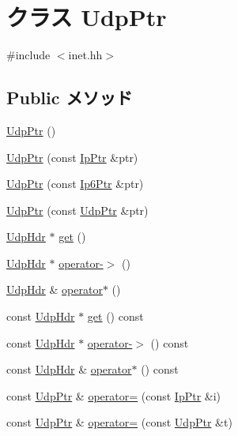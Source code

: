\hypertarget{classNet_1_1UdpPtr}{
\section{クラス UdpPtr}
\label{classNet_1_1UdpPtr}
}


{\ttfamily \#include $<$inet.hh$>$}\subsection*{Public メソッド}
\begin{DoxyCompactItemize}
\item 
\hyperlink{classNet_1_1UdpPtr_abcd425aa7abed2d3c310a9a911ee3dd8}{UdpPtr} ()
\item 
\hyperlink{classNet_1_1UdpPtr_a37b049e8b05df97038b6520b650880f8}{UdpPtr} (const \hyperlink{classNet_1_1IpPtr}{IpPtr} \&ptr)
\item 
\hyperlink{classNet_1_1UdpPtr_afbb62bb41d751a157c1969b023b3ac2c}{UdpPtr} (const \hyperlink{classNet_1_1Ip6Ptr}{Ip6Ptr} \&ptr)
\item 
\hyperlink{classNet_1_1UdpPtr_a3fb1538c6e5e4348f6dfdb963fc4b724}{UdpPtr} (const \hyperlink{classNet_1_1UdpPtr}{UdpPtr} \&ptr)
\item 
\hyperlink{structNet_1_1UdpHdr}{UdpHdr} $\ast$ \hyperlink{classNet_1_1UdpPtr_a894be408d8fb0e2b4224991c64ed69e0}{get} ()
\item 
\hyperlink{structNet_1_1UdpHdr}{UdpHdr} $\ast$ \hyperlink{classNet_1_1UdpPtr_a04f04b83c0b726766c5767db893bf65e}{operator-\/$>$} ()
\item 
\hyperlink{structNet_1_1UdpHdr}{UdpHdr} \& \hyperlink{classNet_1_1UdpPtr_acef4258ce7955f5d7d8d10f79fd19825}{operator$\ast$} ()
\item 
const \hyperlink{structNet_1_1UdpHdr}{UdpHdr} $\ast$ \hyperlink{classNet_1_1UdpPtr_acdc10278933ff9a5efed69df7bdc4230}{get} () const 
\item 
const \hyperlink{structNet_1_1UdpHdr}{UdpHdr} $\ast$ \hyperlink{classNet_1_1UdpPtr_ae6a408523ebfb6e70d224efab6193010}{operator-\/$>$} () const 
\item 
const \hyperlink{structNet_1_1UdpHdr}{UdpHdr} \& \hyperlink{classNet_1_1UdpPtr_aab2f2ca8ddd9aa479e1de4067e47a5fd}{operator$\ast$} () const 
\item 
const \hyperlink{classNet_1_1UdpPtr}{UdpPtr} \& \hyperlink{classNet_1_1UdpPtr_a86eade3b854c44d7f65c9775bc391295}{operator=} (const \hyperlink{classNet_1_1IpPtr}{IpPtr} \&i)
\item 
const \hyperlink{classNet_1_1UdpPtr}{UdpPtr} \& \hyperlink{classNet_1_1UdpPtr_abe501d76a9a5d61533a88257e47ce552}{operator=} (const \hyperlink{classNet_1_1UdpPtr}{UdpPtr} \&t)

\end{DoxyCompactItemize}

